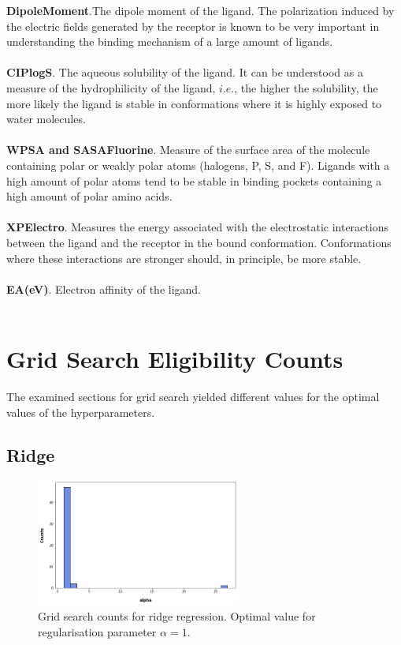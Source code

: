 \textbullet\hspace{0.5cm}\textbf{DipoleMoment}.The dipole moment of the ligand. The polarization induced by the electric fields generated by the receptor is known to be very important in understanding the binding mechanism of a large amount of ligands.\\\\
\textbullet\hspace{0.5cm}\textbf{CIPlogS}. The aqueous solubility of the ligand. It can be understood as a measure of the hydrophilicity of the ligand, $i.e.$, the higher the solubility, the more likely the ligand is stable in conformations where it is highly exposed to water molecules.\\\\
\textbullet\hspace{0.5cm}\textbf{WPSA and SASAFluorine}. Measure of the surface area of the molecule containing polar or weakly polar atoms (halogens, P, S, and F). Ligands with a high amount of polar atoms tend to be stable in binding pockets containing a high amount of polar amino acids.\\\\
\textbullet\hspace{0.5cm}\textbf{XPElectro}. Measures the energy associated with the electrostatic interactions between the ligand and the receptor in the bound conformation. Conformations where these interactions are stronger should, in principle, be more stable.\\\\
\textbullet\hspace{0.5cm}\textbf{EA(eV)}. Electron affinity of the ligand.\\\\


\section*{Grid Search Eligibility Counts}
The examined sections for grid search  yielded different values for the optimal values of the hyperparameters.

\subsection*{Ridge}

\begin{figure}[h!]
    \centering
    \includegraphics[width=0.6\textwidth]{Images/Appendix/CountsRidge.png}
    \caption{Grid search counts for ridge regression. Optimal value for regularisation parameter $\alpha=1$.}
\end{figure}
\newpage

